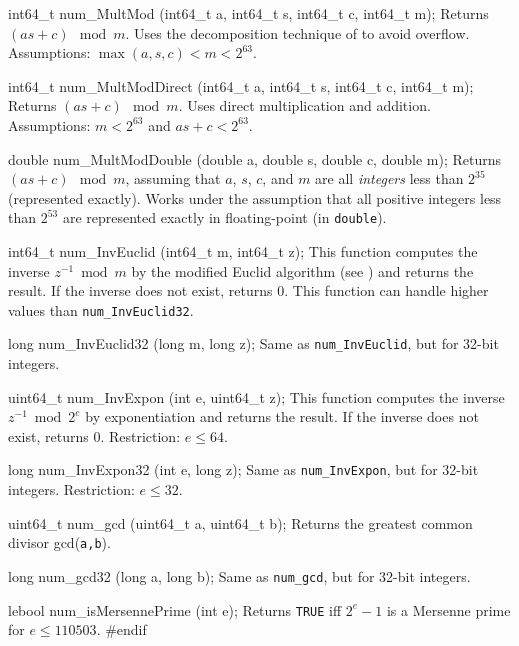 int64_t num_MultMod (int64_t a, int64_t s, int64_t c, int64_t m);
\endcode
\tab  Returns $(as + c) \mod m$.  Uses the decomposition technique
  of \cite{rLEC91a} to avoid overflow.
	Assumptions: $\max(a,s,c) < m < 2^{63}$.
\endtab
\code

int64_t num_MultModDirect (int64_t a, int64_t s, int64_t c, int64_t m);
\endcode
\tab  Returns $(as + c) \mod m$.  Uses direct multiplication and addition.
  Assumptions: $m < 2^{63}$ and $as+c < 2^{63}$.
\endtab
\code

double num_MultModDouble (double a, double s, double c, double m);
\endcode
 \tab  Returns $(as+c) \mod m$, assuming that
  $a$, $s$, $c$, and $m$ are all {\em integers\/} less than $2^{35}$
  (represented exactly).
  Works under the assumption that all positive integers less than
  $2^{53}$ are represented exactly in floating-point (in {\tt double}).
\endtab
\code

int64_t num_InvEuclid (int64_t m, int64_t z);
\endcode
 \tab  This function computes the inverse $z^{-1}\bmod m$ by the
  modified Euclid algorithm (see \cite[p. 325]{iKNU81a}) and returns
  the result. If the inverse does not exist, returns 0. This function
  can handle higher values than {\tt num\_InvEuclid32}.
\endtab
\code

long num_InvEuclid32 (long m, long z);
\endcode
 \tab  Same as \texttt{num\_InvEuclid}, but for 32-bit integers.
\endtab
\code

uint64_t num_InvExpon (int e, uint64_t z);
\endcode
 \tab
  This function computes the inverse  $z^{-1} \bmod 2^e$
  by exponentiation  and returns the result. If the inverse does not  exist, returns 0.
  Restriction: $e \le 64$.
 \endtab
\code

long num_InvExpon32 (int e, long z);
 \endcode
 \tab  Same as \texttt{num\_InvExpon}, but for 32-bit integers.
  Restriction: $e \le 32$.
\endtab
\code

uint64_t num_gcd (uint64_t a, uint64_t b);
 \endcode
 \tab  Returns the greatest common divisor gcd(\texttt{a,b}).
\endtab
\code

long num_gcd32 (long a, long b);
 \endcode
 \tab  Same as \texttt{num\_gcd}, but for 32-bit integers.
\endtab
\code

lebool num_isMersennePrime (int e);
 \endcode
 \tab  Returns \texttt{TRUE} iff $2^e-1$ is a Mersenne prime for $e \le 110503$.
\endtab
\code\hide
#endif
\endhide\endcode
